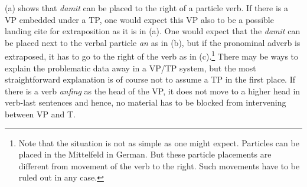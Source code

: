 \zl
(a) shows that \emph{damit} can be placed to the right of a particle verb. If there is a VP
embedded under a TP, one would expect this VP also to be a possible landing cite 
for extraposition as it is in (a). One would expect that the \emph{damit} can be placed next
to the verbal particle \emph{an} as in (b), but if the pronominal adverb is extraposed, it
has to go to the right of the verb as in (c).\footnote{
Note that the situation is not as simple as one might expect. Particles can be placed in the
Mittelfeld in German. But these particle placements are different from movement of the verb to the
right. Such movements have to be ruled out in any case.%
} There may be ways to explain the problematic data away in a
VP/TP system, but the most straightforward explanation is of course not to assume a TP in the first
place. If there is a verb \emph{anfing} as the head of the VP, it does not move to a higher head in
verb-last sentences and hence, no material has to be blocked from intervening between VP and T.


\clearpage



